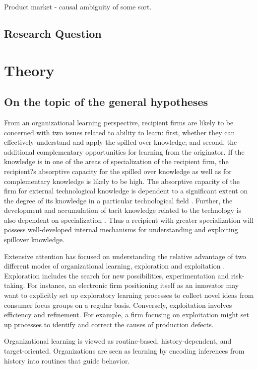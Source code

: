 \documentclass[12pt,letterpaper]{article}
\begin{document}
Product market - causal ambiguity of some sort.

\subsection{Research Question}


\section{Theory}
\subsection{On the topic of the general hypotheses}
From an organizational learning perspective, recipient firms are likely to be concerned with two issues related to ability to learn: first, whether they can effectively understand and apply the spilled over knowledge; and second, the additional complementary opportunities for learning from the originator. If the knowledge is in one of the areas of specialization of the recipient firm, the recipient?s absorptive capacity \citep{Cohen1990} for the spilled over knowledge as well as for complementary knowledge is likely to be high. The absorptive capacity of the firm for external technological knowledge is dependent to a significant extent on the degree of its knowledge in a particular technological field \citep{Schoenmakers2006}. Further, the development and accumulation of tacit knowledge \citep{Polanyi1966} related to the technology is also dependent on specialization \citep{Enright1991}. Thus a recipient with greater specialization will possess well-developed internal mechanisms for understanding and exploiting spillover knowledge.

Extensive attention has focused on understanding the relative advantage of two different modes of organizational learning, exploration and exploitation \cite{March1991a}. Exploration includes the search for new possibilities, experimentation and risk-taking. For instance, an electronic firm positioning itself as an innovator may want to explicitly set up exploratory learning processes to collect novel ideas from consumer focus groups on a regular basis. Conversely, exploitation involves efficiency and refinement. For example, a firm focusing on exploitation might set up processes to identify and correct the causes of production defects.

Organizational learning is viewed as routine-based, history-dependent, and target-oriented. Organizations are seen as learning by encoding inferences from history into routines that guide behavior.
\end{document}
